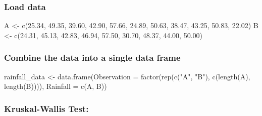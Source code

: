 \documentclass[
]{article}
\newenvironment{Shaded}{\begin{snugshade}}{\end{snugshade}}
\newcommand{\AttributeTok}[1]{\textcolor[rgb]{0.77,0.63,0.00}{#1}}
\newcommand{\FloatTok}[1]{\textcolor[rgb]{0.00,0.00,0.81}{#1}}
\newcommand{\FunctionTok}[1]{\textcolor[rgb]{0.00,0.00,0.00}{#1}}
\newcommand{\NormalTok}[1]{#1}
\newcommand{\OtherTok}[1]{\textcolor[rgb]{0.56,0.35,0.01}{#1}}
\newcommand{\StringTok}[1]{\textcolor[rgb]{0.31,0.60,0.02}{#1}}
\begin{document}
\hypertarget{load-data-7}{%
\subsubsection{Load data}\label{load-data-7}}

\begin{Shaded}
\begin{Highlighting}[]
\NormalTok{A }\OtherTok{\textless{}{-}} \FunctionTok{c}\NormalTok{(}\FloatTok{25.34}\NormalTok{, }\FloatTok{49.35}\NormalTok{, }\FloatTok{39.60}\NormalTok{, }\FloatTok{42.90}\NormalTok{, }\FloatTok{57.66}\NormalTok{, }\FloatTok{24.89}\NormalTok{, }\FloatTok{50.63}\NormalTok{, }\FloatTok{38.47}\NormalTok{, }\FloatTok{43.25}\NormalTok{, }\FloatTok{50.83}\NormalTok{, }\FloatTok{22.02}\NormalTok{)}
\NormalTok{B }\OtherTok{\textless{}{-}} \FunctionTok{c}\NormalTok{(}\FloatTok{24.31}\NormalTok{, }\FloatTok{45.13}\NormalTok{, }\FloatTok{42.83}\NormalTok{, }\FloatTok{46.94}\NormalTok{, }\FloatTok{57.50}\NormalTok{, }\FloatTok{30.70}\NormalTok{, }\FloatTok{48.37}\NormalTok{, }\FloatTok{44.00}\NormalTok{, }\FloatTok{50.00}\NormalTok{)}
\end{Highlighting}
\end{Shaded}

\hypertarget{combine-the-data-into-a-single-data-frame}{%
\subsubsection{Combine the data into a single data
frame}\label{combine-the-data-into-a-single-data-frame}}

\begin{Shaded}
\begin{Highlighting}[]
\NormalTok{rainfall\_data }\OtherTok{\textless{}{-}} \FunctionTok{data.frame}\NormalTok{(}\AttributeTok{Observation =} \FunctionTok{factor}\NormalTok{(}\FunctionTok{rep}\NormalTok{(}\FunctionTok{c}\NormalTok{(}\StringTok{"A"}\NormalTok{, }\StringTok{"B"}\NormalTok{), }\FunctionTok{c}\NormalTok{(}\FunctionTok{length}\NormalTok{(A), }\FunctionTok{length}\NormalTok{(B)))), }
                            \AttributeTok{Rainfall =} \FunctionTok{c}\NormalTok{(A, B))}
\end{Highlighting}
\end{Shaded}

\hypertarget{kruskal-wallis-test-2}{%
\subsubsection{Kruskal-Wallis Test:}\label{kruskal-wallis-test-2}}
\end{document}
